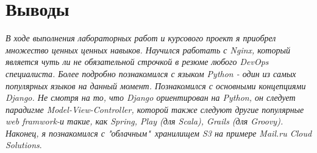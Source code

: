 \section{Выводы}
{\itshape В ходе выполнения лабораторных работ и курсового проект я приобрел множество ценных ценных навыков. Научился работать с Nginx, который является чуть ли не обязательной строчкой в резюме любого DevOps специалиста. Более подробно познакомился с языком Python - один из самых популярных языков на данный момент. Познакомился с основными концепциями Django. Не смотря на то, что Django ориентирован на Python, он следует парадигме Model-View-Controller, которой также следуют другие популярные web framwork-и такие, как Spring, Play (для Scala), Grails (для Groovy). Наконец, я познакомился с "облачным"\ хранилищем S3 на примере Mail.ru Cloud Solutions}.
\pagebreak
